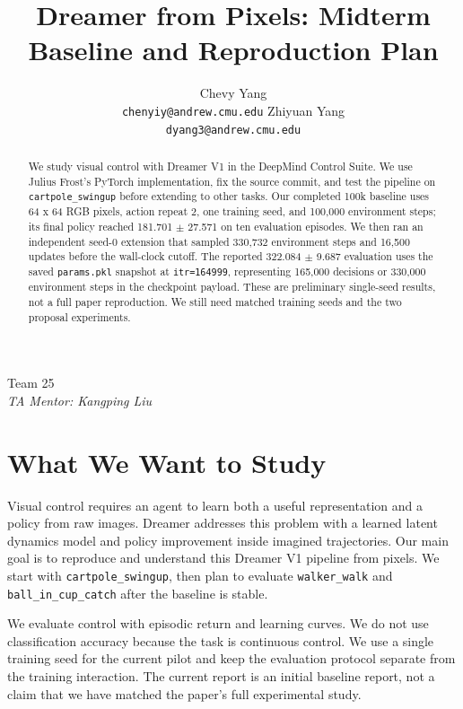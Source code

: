 \documentclass{article}
\title{Dreamer from Pixels: Midterm Baseline and Reproduction Plan}
\author{%
  Chevy Yang \\
  \texttt{chenyiy@andrew.cmu.edu}
  \And
  Zhiyuan Yang \\
  \texttt{dyang3@andrew.cmu.edu}
}
\begin{document}
\maketitle

\begin{center}
Team 25 \\
\textit{TA Mentor: Kangping Liu}
\end{center}

\begin{abstract}
We study visual control with Dreamer V1 in the DeepMind Control Suite. We use Julius Frost's PyTorch implementation, fix the source commit, and test the pipeline on \texttt{cartpole\_swingup} before extending to other tasks. Our completed 100k baseline uses 64 x 64 RGB pixels, action repeat 2, one training seed, and 100,000 environment steps; its final policy reached 181.701 $\pm$ 27.571 on ten evaluation episodes. We then ran an independent seed-0 extension that sampled 330,732 environment steps and 16,500 updates before the wall-clock cutoff. The reported 322.084 $\pm$ 9.687 evaluation uses the saved \texttt{params.pkl} snapshot at \texttt{itr=164999}, representing 165,000 decisions or 330,000 environment steps in the checkpoint payload. These are preliminary single-seed results, not a full paper reproduction. We still need matched training seeds and the two proposal experiments.
\end{abstract}

\section{What We Want to Study}

Visual control requires an agent to learn both a useful representation and a policy from raw images. Dreamer addresses this problem with a learned latent dynamics model and policy improvement inside imagined trajectories. Our main goal is to reproduce and understand this Dreamer V1 pipeline from pixels. We start with \texttt{cartpole\_swingup}, then plan to evaluate \texttt{walker\_walk} and \texttt{ball\_in\_cup\_catch} after the baseline is stable.

We evaluate control with episodic return and learning curves. We do not use classification accuracy because the task is continuous control. We use a single training seed for the current pilot and keep the evaluation protocol separate from the training interaction. The current report is an initial baseline report, not a claim that we have matched the paper's full experimental study.
\end{document}
